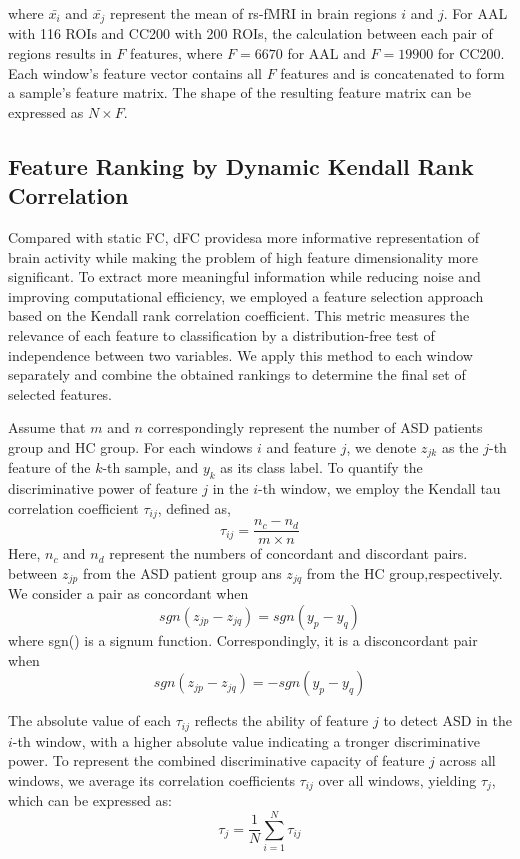 \documentclass[journal,twoside,web]{ieeecolor}
\begin{document}
where $\bar{x_{i}}$ and $\bar{x_{j}}$ represent the mean of rs-fMRI in brain regions $i$ and $j$. For AAL with 116 ROIs and CC200 with 200 ROIs, the calculation between each pair of regions results in $F$ features, where $F=6670$ for AAL and $F=19900$ for CC200. Each window's feature vector contains all $F$ features and is concatenated to form a sample's feature matrix. The shape of the resulting feature matrix can be expressed as $N\times F$.
\subsection{Feature Ranking by Dynamic Kendall Rank Correlation}
Compared with static FC, dFC providesa more informative representation of brain activity while making the problem of high feature dimensionality more significant. To extract more meaningful information while reducing noise and improving computational efficiency, we employed a feature selection approach based on the Kendall rank correlation coefficient. This metric measures the relevance of each feature to classification by a distribution-free test of independence between two variables\cite{zeng2012identifying}. We apply this method to each window separately and combine the obtained rankings to determine the final set of selected features. 

Assume that $m$ and $n$ correspondingly represent the number of ASD patients group and HC group. For each windows $i$ and feature $j$, we denote $z_{jk}$ as the $j$-th feature of the $k$-th sample, and $y_k$ as its class label. To quantify the discriminative power of feature $j$ in the $i$-th window, we employ the Kendall tau correlation coefficient $\tau_{ij}$, defined as,
\begin{equation}
	\tau_{ij} = \frac{n_c - n_d}{m \times n}
\end{equation}
Here, $n_c$ and $n_d$ represent the numbers of concordant and discordant pairs. between $z_{jp}$ from the ASD patient group ans $z_{jq}$ from the HC group,respectively. We consider a pair as concordant when
\begin{equation}
	sgn(z_{jp} - z_{jq}) = sgn(y_p-y_q)
\end{equation}
where sgn() is a signum function. Correspondingly, it is a disconcordant pair when
\begin{equation}
	sgn(z_{jp} - z_{jq}) = -sgn(y_p-y_q)
\end{equation}

The absolute value of each $\tau_{ij}$ reflects the ability of feature $j$ to detect ASD in the $i$-th window, with a higher absolute value indicating a tronger discriminative power. To represent the combined discriminative capacity of feature $j$ across all windows, we average its correlation coefficients $\tau_{ij}$ over all windows, yielding $\tau_{j}$, which can be expressed as:
\begin{equation}
	\tau_{j} =  \frac{1}{N}\sum_{i=1}^{N}\tau_{ij}
\end{equation}
\end{document}
